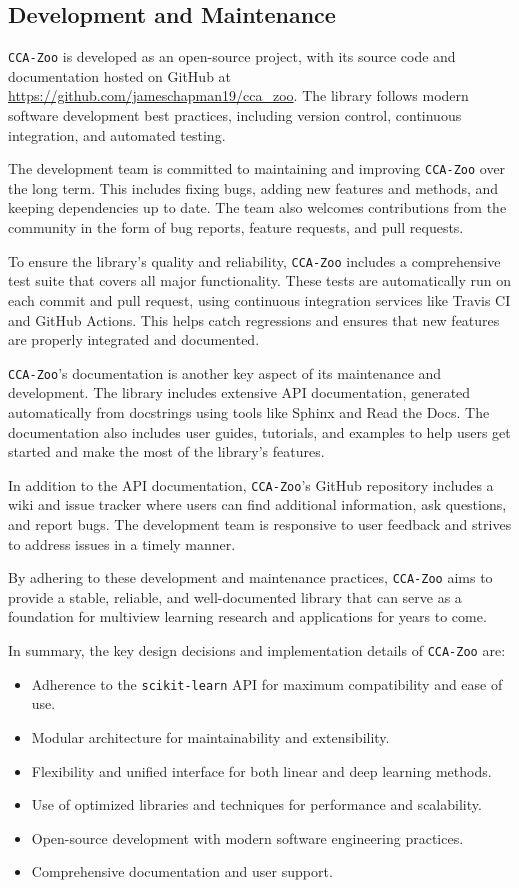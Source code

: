 \subsection{Development and Maintenance}

\texttt{CCA-Zoo} is developed as an open-source project, with its source code and documentation hosted on GitHub at \url{https://github.com/jameschapman19/cca_zoo}. The library follows modern software development best practices, including version control, continuous integration, and automated testing.

The development team is committed to maintaining and improving \texttt{CCA-Zoo} over the long term. This includes fixing bugs, adding new features and methods, and keeping dependencies up to date. The team also welcomes contributions from the community in the form of bug reports, feature requests, and pull requests.

To ensure the library's quality and reliability, \texttt{CCA-Zoo} includes a comprehensive test suite that covers all major functionality. These tests are automatically run on each commit and pull request, using continuous integration services like Travis CI and GitHub Actions. This helps catch regressions and ensures that new features are properly integrated and documented.

\texttt{CCA-Zoo}'s documentation is another key aspect of its maintenance and development. The library includes extensive API documentation, generated automatically from docstrings using tools like Sphinx and Read the Docs. The documentation also includes user guides, tutorials, and examples to help users get started and make the most of the library's features.

In addition to the API documentation, \texttt{CCA-Zoo}'s GitHub repository includes a wiki and issue tracker where users can find additional information, ask questions, and report bugs. The development team is responsive to user feedback and strives to address issues in a timely manner.

By adhering to these development and maintenance practices, \texttt{CCA-Zoo} aims to provide a stable, reliable, and well-documented library that can serve as a foundation for multiview learning research and applications for years to come.

In summary, the key design decisions and implementation details of \texttt{CCA-Zoo} are:

\begin{itemize}
\item Adherence to the \texttt{scikit-learn} API for maximum compatibility and ease of use.
\item Modular architecture for maintainability and extensibility.
\item Flexibility and unified interface for both linear and deep learning methods.
\item Use of optimized libraries and techniques for performance and scalability.
\item Open-source development with modern software engineering practices.
\item Comprehensive documentation and user support.
\end{itemize}

